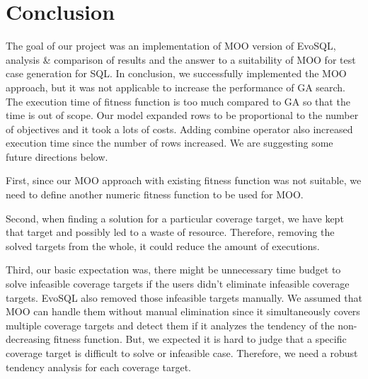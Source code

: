 \chapter{Conclusion}

The goal of our project was an implementation of MOO version of EvoSQL, analysis \& comparison of results and the answer to a suitability of MOO for test case generation for SQL.
In conclusion, we successfully implemented the MOO approach, but it was not applicable to increase the performance of GA search. The execution time  of fitness function is too much compared to GA so that the time is out of scope. Our model expanded rows to be proportional to the number of objectives and it took a lots of costs. Adding combine operator also increased execution time since the number of rows increased. We are suggesting some future directions below.

First, since our MOO approach with existing fitness function was not suitable, we need to define another numeric fitness function to be used for MOO. 


Second, when finding a solution for a particular coverage target, we have kept that target and possibly led to a waste of resource. Therefore, removing the solved targets from the whole, it could reduce the amount of executions. 


Third, our basic expectation was, there might be unnecessary time budget to solve infeasible coverage targets if the users didn't eliminate infeasible coverage targets. EvoSQL also removed those infeasible targets manually. We assumed that MOO can handle them without manual elimination since it simultaneously covers multiple coverage targets and detect them if it analyzes the tendency of the non-decreasing fitness function. But, we expected it is hard to judge that a specific coverage target is difficult to solve or infeasible case. Therefore, we need a robust tendency analysis for each coverage target. 
